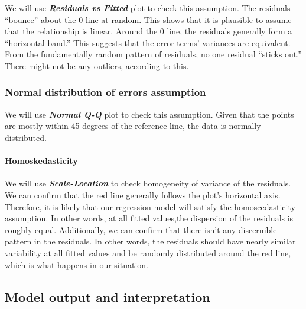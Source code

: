 \documentclass[
]{article}
\begin{document}
We will use \textbf{\emph{Residuals vs Fitted}} plot to check this
assumption. The residuals ``bounce'' about the 0 line at random. This
shows that it is plausible to assume that the relationship is linear.
Around the 0 line, the residuals generally form a ``horizontal band.''
This suggests that the error terms' variances are equivalent. From the
fundamentally random pattern of residuals, no one residual ``sticks
out.'' There might not be any outliers, according to this.

\hypertarget{normal-distribution-of-errors-assumption}{%
\subsubsection{Normal distribution of errors
assumption}\label{normal-distribution-of-errors-assumption}}

We will use \textbf{\emph{Normal Q-Q}} plot to check this assumption.
Given that the points are mostly within 45 degrees of the reference
line, the data is normally distributed.

\hypertarget{homoskedasticity}{%
\paragraph{Homoskedasticity}\label{homoskedasticity}}

We will use \textbf{\emph{Scale-Location}} to check homogeneity of
variance of the residuals. We can confirm that the red line generally
follows the plot's horizontal axis. Therefore, it is likely that our
regression model will satisfy the homoscedasticity assumption. In other
words, at all fitted values,the dispersion of the residuals is roughly
equal. Additionally, we can confirm that there isn't any discernible
pattern in the residuals. In other words, the residuals should have
nearly similar variability at all fitted values and be randomly
distributed around the red line, which is what happens in our situation.

\hypertarget{model-output-and-interpretation}{%
\subsection{Model output and
interpretation}\label{model-output-and-interpretation}}
\end{document}
